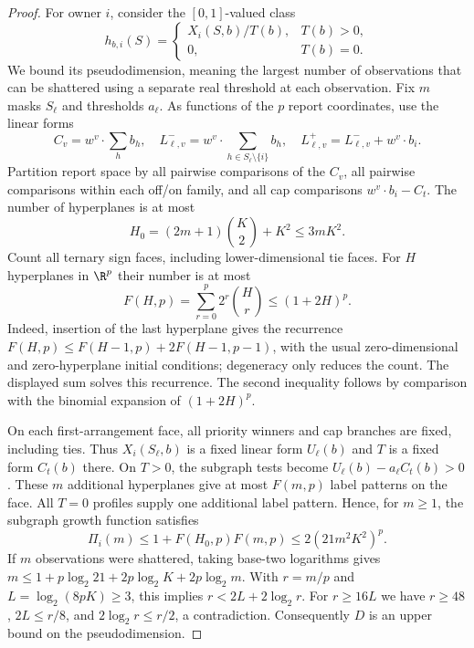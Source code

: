\begin{proof}
For owner $i$, consider the $[0,1]$-valued class
\[
 h_{b,i}(S)=\begin{cases}X_i(S,b)/T(b),&T(b)>0,\\0,&T(b)=0.
 \end{cases}
\]
We bound its pseudodimension, meaning the largest number of observations
that can be shattered using a separate real threshold at each observation.
Fix $m$ masks $S_\ell$ and thresholds $a_\ell$.
As functions of the $p$ report coordinates, use the linear forms
\[
 C_v=w^v\cdot\sum_h b_h,\quad
 L^-_{\ell,v}=w^v\cdot\sum_{h\in S_\ell\setminus\{i\}}b_h,
 \quad L^+_{\ell,v}=L^-_{\ell,v}+w^v\cdot b_i.
\]
Partition report space by all pairwise comparisons of the $C_v$, all pairwise
comparisons within each off/on family, and all cap comparisons
$w^v\cdot b_i-C_t$.  The number of hyperplanes is at most
\[
 H_0=(2m+1)\binom K2+K^2\le3mK^2.
\]
Count all ternary sign faces, including lower-dimensional tie faces.
For $H$ hyperplanes in $\R^p$ their number is at most
\begin{equation}\label{alg:faces}
 F(H,p)=\sum_{r=0}^p2^r\binom Hr\le(1+2H)^p.
\end{equation}
Indeed, insertion of the last hyperplane gives the recurrence
$F(H,p)\le F(H-1,p)+2F(H-1,p-1)$, with the usual zero-dimensional
and zero-hyperplane initial conditions; degeneracy only reduces the count.
The displayed sum solves this recurrence.  The second inequality follows
by comparison with the binomial expansion of $(1+2H)^p$.

On each first-arrangement face, all priority winners and cap branches are
fixed, including ties.  Thus $X_i(S_\ell,b)$ is a fixed linear form
$U_\ell(b)$ and $T$ is a fixed form $C_t(b)$ there.
On $T>0$, the subgraph tests become
$U_\ell(b)-a_\ell C_t(b)>0$.  These $m$ additional hyperplanes give at
most $F(m,p)$ label patterns on the face.  All $T=0$ profiles supply one
additional label pattern.  Hence, for $m\ge1$, the subgraph growth function
satisfies
\[
 \Pi_i(m)\le1+F(H_0,p)F(m,p)\le2(21m^2K^2)^p.
\]
If $m$ observations were shattered, taking base-two logarithms gives
$m\le1+p\log_2 21+2p\log_2K+2p\log_2m$.
With $r=m/p$ and $L=\log_2(8pK)\ge3$, this implies
$r<2L+2\log_2r$.  For $r\ge16L$ we have $r\ge48$,
$2L\le r/8$, and $2\log_2r\le r/2$, a contradiction.
Consequently $D$ is an upper bound on the pseudodimension.


\end{proof}
